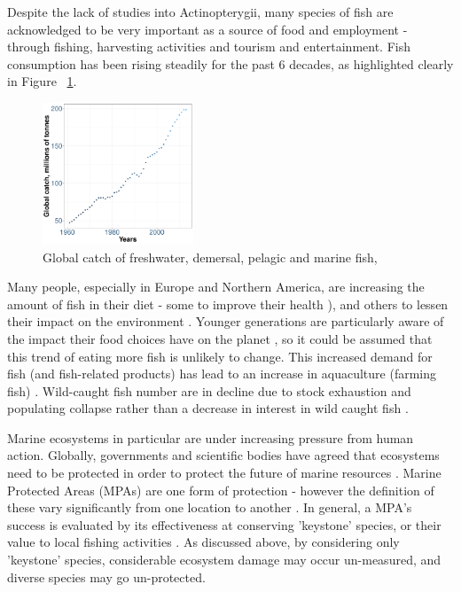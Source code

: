 \documentclass[11pt]{article}
\begin{document}
Despite the lack of studies into Actinopterygii, many species of fish are 
acknowledged to be very important as a source of food and employment - through 
fishing, harvesting activities and tourism and entertainment. Fish consumption 
has been rising steadily for the past 6 decades, as highlighted clearly in 
Figure ~\ref{GlobalCatch}. 

\begin{figure}
	
	\includegraphics[width=0.4\textwidth]{Images/GobalCatch.pdf}	
	\caption{Global catch of freshwater, demersal, pelagic and marine fish, \\
	\autocite{FAO2020} }  
	\label{GlobalCatch}
	
\end{figure}


Many people, especially in Europe and Northern 
America, are increasing the amount of fish in their diet - some to improve 
their health 
\autocite{Rimm2006}), and others to 
lessen their impact on the environment \autocite{Mary2020}. Younger generations 
are particularly aware of the impact their food choices have on the planet 
\autocite{Mary2020}, so it could be assumed that this trend of eating more fish 
is unlikely to change. This increased demand for fish (and fish-related 
products) has lead to an increase in aquaculture (farming fish) 
\autocite{Belton2018}. Wild-caught 
fish number are in decline due to stock exhaustion and 
populating collapse rather than a decrease in interest in wild caught fish 
\autocite{Tremblay2011, Belton2018}. 

Marine ecosystems in particular are under increasing pressure from human 
action. Globally, governments and scientific bodies have agreed that ecosystems 
need to be protected in order to protect the future of marine resources 
\autocite{MurakiGottlieb2018}. Marine Protected Areas (MPAs) are one form of 
protection - 
however the definition of these vary significantly from one location to 
another \autocite{Marinesque2012}. In general,  a MPA's success is evaluated by 
its effectiveness at conserving 'keystone' species, or their value to local 
fishing activities \autocite{Marinesque2012}. As discussed above, by 
considering only 'keystone' species, considerable ecosystem damage may occur 
un-measured, and diverse species may go un-protected. 
\end{document}
